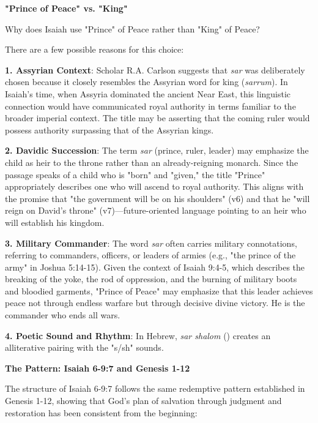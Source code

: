\documentclass[11pt]{article}
\begin{document}
\newpage
{\large\bfseries "Prince of Peace" vs. "King"}
\vspace{1em}

Why does Isaiah use "Prince" of Peace rather than "King" of Peace?
{}

There are a few possible reasons for this choice:

\textbf{1. Assyrian Context}: Scholar R.A. Carlson suggests that \textit{sar} was deliberately chosen because it closely resembles the Assyrian word for king (\textit{sarrum}). In Isaiah's time, when Assyria dominated the ancient Near East, this linguistic connection would have communicated royal authority in terms familiar to the broader imperial context. The title may be asserting that the coming ruler would possess authority surpassing that of the Assyrian kings.

\textbf{2. Davidic Succession}: The term \textit{sar} (prince, ruler, leader) may emphasize the child as heir to the throne rather than an already-reigning monarch. Since the passage speaks of a child who is "born" and "given," the title "Prince" appropriately describes one who will ascend to royal authority. This aligns with the promise that "the government will be on his shoulders" (v6) and that he "will reign on David's throne" (v7)—future-oriented language pointing to an heir who will establish his kingdom.

\textbf{3. Military Commander}: The word \textit{sar} often carries military connotations, referring to commanders, officers, or leaders of armies (e.g., "the prince of the army" in Joshua 5:14-15). Given the context of Isaiah 9:4-5, which describes the breaking of the yoke, the rod of oppression, and the burning of military boots and bloodied garments, "Prince of Peace" may emphasize that this leader achieves peace not through endless warfare but through decisive divine victory. He is the commander who ends all wars.

\textbf{4. Poetic Sound and Rhythm}: In Hebrew, \textit{sar shalom} () creates an alliterative pairing with the "s/sh" sounds.

\newpage
{\large\bfseries The Pattern: Isaiah 6-9:7 and Genesis 1-12}
\vspace{1em}

The structure of Isaiah 6-9:7 follows the same redemptive pattern established in Genesis 1-12, showing that God's plan of salvation through judgment and restoration has been consistent from the beginning:
\end{document}
